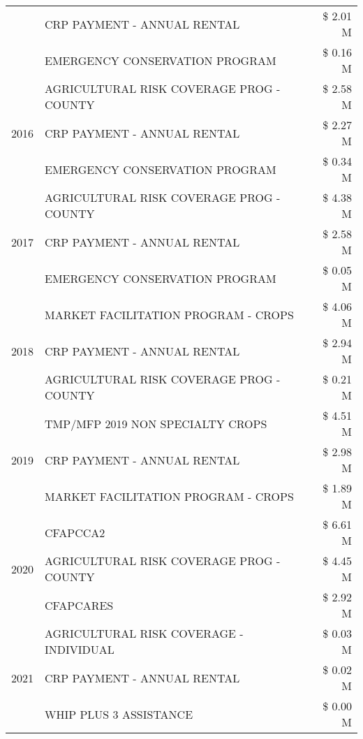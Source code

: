 \begin{tabular}{llr}
 & CRP PAYMENT - ANNUAL RENTAL & \$ 2.01 M \\
 & EMERGENCY CONSERVATION PROGRAM & \$ 0.16 M \\
\cline{1-3}
\multirow[t]{3}{*}{2016} & AGRICULTURAL RISK COVERAGE PROG - COUNTY & \$ 2.58 M \\
 & CRP PAYMENT - ANNUAL RENTAL & \$ 2.27 M \\
 & EMERGENCY CONSERVATION PROGRAM & \$ 0.34 M \\
\cline{1-3}
\multirow[t]{3}{*}{2017} & AGRICULTURAL RISK COVERAGE PROG - COUNTY & \$ 4.38 M \\
 & CRP PAYMENT - ANNUAL RENTAL & \$ 2.58 M \\
 & EMERGENCY CONSERVATION PROGRAM & \$ 0.05 M \\
\cline{1-3}
\multirow[t]{3}{*}{2018} & MARKET FACILITATION PROGRAM - CROPS & \$ 4.06 M \\
 & CRP PAYMENT - ANNUAL RENTAL & \$ 2.94 M \\
 & AGRICULTURAL RISK COVERAGE PROG - COUNTY & \$ 0.21 M \\
\cline{1-3}
\multirow[t]{3}{*}{2019} & TMP/MFP 2019 NON SPECIALTY CROPS & \$ 4.51 M \\
 & CRP PAYMENT - ANNUAL RENTAL & \$ 2.98 M \\
 & MARKET FACILITATION PROGRAM - CROPS & \$ 1.89 M \\
\cline{1-3}
\multirow[t]{3}{*}{2020} & CFAPCCA2 & \$ 6.61 M \\
 & AGRICULTURAL RISK COVERAGE PROG - COUNTY & \$ 4.45 M \\
 & CFAPCARES & \$ 2.92 M \\
\cline{1-3}
\multirow[t]{3}{*}{2021} & AGRICULTURAL RISK COVERAGE - INDIVIDUAL & \$ 0.03 M \\
 & CRP PAYMENT - ANNUAL RENTAL & \$ 0.02 M \\
 & WHIP PLUS 3 ASSISTANCE & \$ 0.00 M \\
\cline{1-3}
\bottomrule
\end{tabular}
